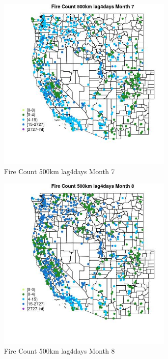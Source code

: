 \begin{figure} 
\centering  
\includegraphics[width=0.77\textwidth]{Code_Outputs/Report_ML_input_PM25_Step4_part_f_de_duplicated_aves_prioritize_24hr_obswNAs_MapObsMo7Fire_Count_500km_lag4days.jpg} 
\caption{\label{fig:Report_ML_input_PM25_Step4_part_f_de_duplicated_aves_prioritize_24hr_obswNAsMapObsMo7Fire_Count_500km_lag4days}Fire Count 500km lag4days Month 7} 
\end{figure} 
 

\begin{figure} 
\centering  
\includegraphics[width=0.77\textwidth]{Code_Outputs/Report_ML_input_PM25_Step4_part_f_de_duplicated_aves_prioritize_24hr_obswNAs_MapObsMo8Fire_Count_500km_lag4days.jpg} 
\caption{\label{fig:Report_ML_input_PM25_Step4_part_f_de_duplicated_aves_prioritize_24hr_obswNAsMapObsMo8Fire_Count_500km_lag4days}Fire Count 500km lag4days Month 8} 
\end{figure} 
 

